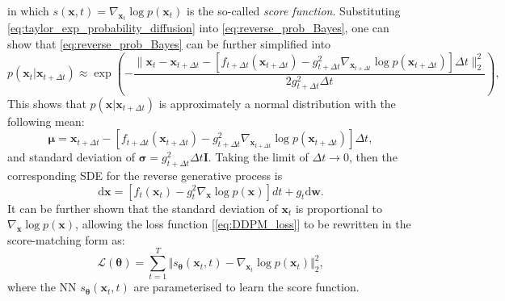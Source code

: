 in which $s(\bm{x},t)=\nabla_{\bm{x}_t}\log p(\bm{x}_t)$ is  the so-called \emph{score function}. Substituting \cref{eq:taylor_exp_probability_diffusion} into \cref{eq:reverse_prob_Bayes}, one can show that \cref{eq:reverse_prob_Bayes} can be further simplified into
\begin{equation}
    \label{eq:reverse_prob_Bayes_2}
    p(\bm{x}_t|\bm{x}_{t+\Delta t})\approx \exp\left(-\frac{\|\bm{x}_t- \bm{x}_{t+\Delta t}-[f_{t+\Delta t}(\bm{x}_{t+\Delta t})-g_{t+\Delta t}^2 \nabla_{\bm{x}_{t+\Delta t}} \log p(\bm{x}_{t+\Delta t})]\Delta t\|_2^2}{2g_{t+\Delta t}^2\Delta t}\right),
\end{equation}
This shows that $p(\bm{x}|\bm{x}_{t+\Delta t})$ is approximately a normal distribution with the following mean:
\begin{equation*}
    \bm{\mu}=\bm{x}_{t+\Delta t}-[f_{t+\Delta t}(\bm{x}_{t+\Delta t})-g_{t+\Delta t}^2 \nabla_{\bm{x}_{t+\Delta t}} \log p(\bm{x}_{t+\Delta t})]\Delta t,
\end{equation*}
and standard deviation of $\bm{\sigma}=g_{t+\Delta t}^2\Delta t\bm{I}$. Taking the limit of $\Delta t\to 0$, then the corresponding SDE for the reverse generative process is
\begin{equation}
    \label{eq:reverse_generation_SDE}
    \mathrm{d}\bm{x}=[f_t(\bm{x}_t)-g_t^2\nabla_{\bm{x}}\log p(\bm{x})]dt +g_t \mathrm{d}\boldsymbol{w}. 
\end{equation}
It can be further shown that the standard deviation of $\bm{x}_t$ is proportional to $\nabla_{\bm{x}}\log p(\bm{x})$, allowing the loss function [\cref{eq:DDPM_loss}] to be rewritten in the score-matching form as:
\begin{equation}
    \label{eq:DDPM_score_matching_loss}
    \mathcal{L}(\boldsymbol{\theta})=\sum_{t=1}^T\big\Vert s_{\boldsymbol{\theta}}(\bm{x}_t,t)-\nabla_{\bm{x}_t}\log p(\bm{x}_t)\big\Vert_2^2,
\end{equation}
where the NN $s_{\boldsymbol{\theta}}(\bm{x}_t,t)$ are parameterised to learn the score function. 

